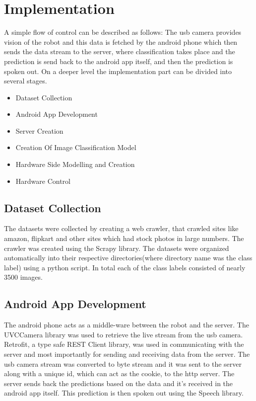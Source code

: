 \documentclass{fisatproject}
\begin{document}
\section{Implementation}
A simple flow of control can be described as follows:\newline\newline
The usb camera provides vision of the robot and this data is fetched by the android phone which then sends the data stream to the server, where classification takes place and the prediction is send back to the android app itself, and then the prediction is spoken out.\newline\newline
On a deeper level the implementation part can be divided into several stages.
\begin{itemize}
    \item Dataset Collection
    \item Android App Development
    \item Server Creation
    \item Creation Of Image Classification Model
    \item Hardware Side Modelling and Creation
    \item Hardware Control
\end{itemize}
\subsection{Dataset Collection}
The datasets were collected by creating a web crawler, that crawled sites like amazon, flipkart and other sites which had stock photos in large numbers. The crawler was created using the Scrapy library. The datasets were organized automatically into their respective directories(where directory name was the class label) using a python script. In total each of the class labels consisted of nearly 3500 images.
\subsection{Android App Development}
The android phone acts as a middle-ware between the robot and the server. The UVCCamera library was used to retrieve the live stream from the usb camera. Retrofit, a type safe REST Client library, was used in communicating with the server and most importantly for sending and receiving data from the server. The usb camera stream was converted to byte stream and it was sent to the server along with a unique id, which can act as the cookie, to the http server. The server sends back the predictions based on the data and it's received in the android app itself. This prediction is then spoken out using the Speech library.
\end{document}
